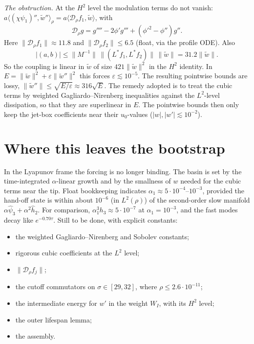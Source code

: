 \documentclass[11pt]{amsart}
\theoremstyle{remark}
\newcommand{\eps}{\varepsilon}
\newcommand{\ip}[2]{\langle #1,#2\rangle}
\begin{document}
\emph{The obstruction.} At the $H^2$ level the modulation terms do not vanish: $a\ip{(\chi\psi_1)''}{\tilde w''}_\rho=a\ip{\mathcal D_\rho f_1}{\tilde w}$, with
\[
\mathcal D_\rho g=g''''-2\phi'g'''+(\phi'^2-\phi'')g'' .
\]
Here $\|\mathcal D_\rho f_1\|\approx11.8$ and $\|\mathcal D_\rho f_2\|\le6.5$ (float, via the profile ODE). Also
\[
|(a,b)|\le\|M^{-1}\|\,\|(L^*f_1,L^*f_2)\|\,\|\tilde w\|=31.2\|\tilde w\| .
\]
 So the coupling is linear in $\tilde w$ of size $421\|\tilde w\|^2$ in the $H^2$ identity. In $E=\|\tilde w\|^2+\eps\|\tilde w''\|^2$ this forces $\eps\lesssim10^{-5}$. The resulting pointwise bounds are lossy, $\|\tilde w''\|\le\sqrt{E/\eps}\approx316\sqrt E$. The remedy adopted is to treat the cubic terms by weighted Gagliardo--Nirenberg inequalities against the $L^2$-level dissipation, so that they are superlinear in $E$. The pointwise bounds then only keep the jet-box coefficients near their $u_0$-values ($|w|,|w'|\lesssim10^{-2}$).

\section{Where this leaves the bootstrap}
In the Lyapunov frame the forcing is no longer binding. The basin is set by the time-integrated $\alpha$-linear growth and by the smallness of $w$ needed for the cubic terms near the tip. Float bookkeeping indicates $\alpha_1\approx5\cdot10^{-4}$--$10^{-3}$, provided the hand-off state is within about $10^{-6}$ (in $L^2(\rho)$) of the second-order slow manifold $\alpha\hat\psi_3+\alpha^2\hat h_2$. For comparison, $\alpha_1^3h_3\approx5\cdot10^{-7}$ at $\alpha_1=10^{-3}$, and the fast modes decay like $e^{-0.70\tau}$. Still to be done, with explicit constants:
\begin{itemize}
\item the weighted Gagliardo--Nirenberg and Sobolev constants;
\item rigorous cubic coefficients at the $L^2$ level;
\item $\|\mathcal D_\rho f_j\|$;
\item the cutoff commutators on $\sigma\in[29,32]$, where $\rho\le2.6\cdot10^{-11}$;
\item the intermediate energy for $w'$ in the weight $W_I$, with its $H^2$ level;
\item the outer lifespan lemma;
\item the assembly.
\end{itemize}
\end{document}
